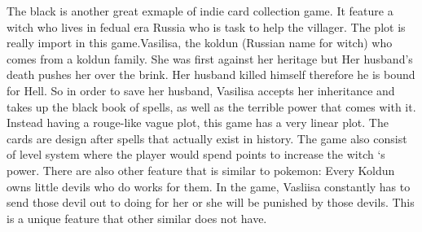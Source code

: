 \documentclass[10pt,twocolumn]{article}
\begin{document}
The black is another great exmaple of indie card collection game. It feature a witch who lives in fedual era Russia who is task to help the villager. The plot is really import in this game.Vasilisa, the koldun (Russian name for witch) who comes from a koldun family. She was first against her heritage but Her husband's death pushes her over the brink. Her husband killed himself therefore he is  bound for Hell. So in order to save her husband, Vasilisa accepts her inheritance and takes up the black book of spells, as well as the terrible power that comes with it.  Instead having a rouge-like vague plot, this game has a very linear plot. The cards are design after spells that actually exist in history. The game also consist of level system where the player would spend points to increase the witch ‘s power. There are also other feature that is similar to pokemon: Every Koldun owns little devils who do works for them. In the game, Vasliisa constantly has to send those devil out to doing for her or she will be punished by those devils. This is a unique feature that other similar does not have.

 
\end{document}
